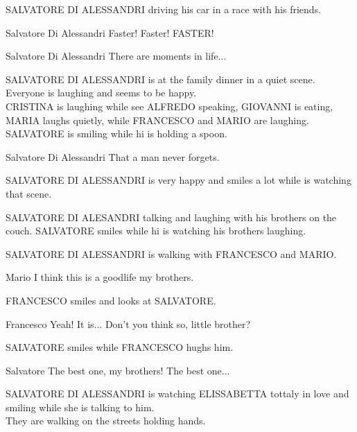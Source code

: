 \documentclass{screenplay}[2020/03/26]
\begin{document}

\fadeout
{}
SALVATORE DI ALESSANDRI driving his car in a race with his friends.
\begin{dialogue}[euphoric]{Salvatore Di Alessandri}
Faster! Faster! FASTER!
\end{dialogue}

\begin{dialogue}[narrating]{Salvatore Di Alessandri}
There are moments in life...
\end{dialogue}


\fadeout
{}
SALVATORE DI ALESSANDRI is at the family dinner in a quiet scene. Everyone is laughing and seems to be happy.
\\CRISTINA is laughing while see ALFREDO speaking, GIOVANNI is eating, MARIA laughs quietly, while FRANCESCO and MARIO are laughing. SALVATORE is smiling while hi is holding a spoon.

\begin{dialogue}[narrating]{Salvatore Di Alessandri}
That a man never forgets.
\end{dialogue}

SALVATORE DI ALESSANDRI is very happy and smiles a lot while is watching that scene.


\fadein
{}
SALVATORE DI ALESANDRI talking and laughing with his brothers on the couch.
SALVATORE smiles while hi is watching his brothers laughing.


\fadein
{}
SALVATORE DI ALESSANDRI is walking with FRANCESCO and MARIO.
\begin{dialogue}{Mario}
I think this is a goodlife my brothers.
\end{dialogue}
FRANCESCO smiles and looks at SALVATORE.
\begin{dialogue}[happy]{Francesco}
Yeah! It is... Don't you think so, little brother?
\end{dialogue}
SALVATORE smiles while FRANCESCO hughs him.
\begin{dialogue}[smiling]{Salvatore}
The best one, my brothers! The best one...
\end{dialogue}


\fadein
{}
SALVATORE DI ALESSANDRI is watching ELISSABETTA tottaly in love and smiling while she is talking to him.
\\They are walking on the streets holding hands.
\fadein
\end{document}
